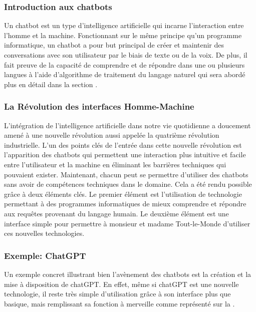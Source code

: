 \documentclass{rapport}
\begin{document}
\subsubsection{Introduction aux chatbots}
Un chatbot est un type d'intelligence artificielle qui incarne l'interaction entre l'homme et la machine. Fonctionnant sur le même principe qu'un programme informatique, un chatbot a pour but principal de créer et maintenir des conversations avec son utilisateur par le biais de texte ou de la voix. De plus, il fait preuve de la capacité de comprendre et de répondre dans une ou plusieurs langues à l'aide d'algorithme de traitement du langage naturel qui sera abordé plus en détail dans la section . 

\subsubsection{La Révolution des interfaces Homme-Machine}
L'intégration de l'intelligence artificielle dans notre vie quotidienne a doucement amené à une nouvelle révolution aussi appelée la quatrième révolution industrielle. L'un des points clés de l'entrée dans cette nouvelle révolution est l'apparition des chatbots qui permettent une interaction plus intuitive et facile entre l'utilisateur et la machine en éliminant les barrières techniques qui pouvaient exister. Maintenant, chacun peut se permettre d'utiliser des chatbots sans avoir de compétences techniques dans le domaine. Cela a été rendu possible grâce à deux éléments clés. Le premier élément est l'utilisation de technologie permettant à des programmes informatiques de mieux comprendre et répondre aux requêtes provenant du langage humain. Le deuxième élément est une interface simple pour permettre à monsieur et madame Tout-le-Monde d'utiliser ces nouvelles technologies.

\subsubsection{Exemple: ChatGPT}
Un exemple concret illustrant bien l'avènement des chatbots est la création et la mise à disposition de chatGPT. En effet, même si chatGPT est une nouvelle technologie, il reste très simple d'utilisation grâce à son interface plus que basique, mais remplissant sa fonction à merveille comme représenté sur la .
\end{document}
